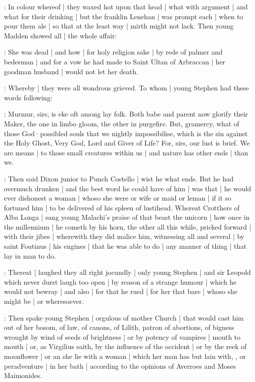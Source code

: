 :
In colour whereof |
they waxed hot upon that head |
what with argument |
and what for their drinking |
but the franklin Lenehan |
was prompt each |
when to pour them ale |
so that at the least way |
mirth might not lack.
Then young Madden showed all |
the whole affair:

\madden:
She was dead |
and how |
for holy religion sake |
by rede of palmer and bedesman |
and for a vow he had made to Saint Ultan of Arbraccan |
her goodman husband |
would not let her death.

:
Whereby |
they were all wondrous grieved.
To whom |
young Stephen had these words following:

\stephen:
Murmur,
sirs,
is eke oft among lay folk.
Both babe and parent now glorify their Maker,
the one in limbo gloom,
the other in purgefire.
But,
gramercy,
what of those God·possibled souls that we nightly impossibilise,
which is the sin against the Holy Ghost,
Very God,
Lord and Giver of Life?
For,
sirs,
our lust is brief.
We are means |
to those small creatures within us |
and nature has other ends |
than we.

:
Then said Dixon junior to Punch Costello |
wist he what ends.
But he had overmuch drunken |
and the best word he could have of him |
was that |
he would ever dishonest a woman |
whoso she were or wife or maid or leman |
if it so fortuned him |
to be delivered of his spleen of lustihead.
Whereat Crotthers of Alba Longa |
sang young Malachi's praise of that beast the unicorn |
how once in the millennium |
he cometh by his horn,
the other all this while,
pricked forward |
with their jibes |
wherewith they did malice him,
witnessing all and several |
by saint Foutinus |
his engines |
that he was able to do |
any manner of thing |
that lay in man to do.

:
Thereat |
laughed they all right jocundly |
only young Stephen |
and sir Leopold which never durst laugh too open |
by reason of a strange humour |
which he would not bewray |
and also |
for that he rued |
for her that bare |
whoso she might be |
or wheresoever.

:
Then spake young Stephen |
orgulous of mother Church |
that would cast him out of her bosom,
of law,
of canons,
of Lilith,
patron of abortions,
of bigness wrought by wind of seeds of brightness |
or by potency of vampires |
mouth to mouth |
or,
as Virgilius saith,
by the influence of the occident |
or by the reek of moonflower |
or an she lie with a woman |
which her man has but lain with,
,
or peradventure |
in her bath |
according to the opinions of Averroes and Moses Maimonides.

